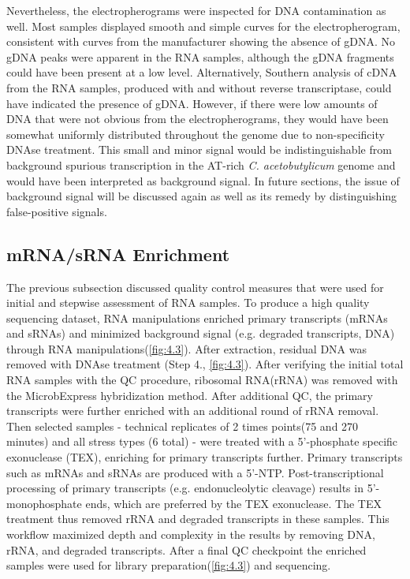 Nevertheless, the electropherograms were inspected for DNA contamination as well. Most samples displayed smooth and simple curves for the electropherogram, consistent with curves from the manufacturer showing the absence of gDNA.\cite{204} No gDNA peaks were apparent in the RNA samples, although the gDNA fragments could have been present at a low level. Alternatively, Southern analysis of cDNA from the RNA samples, produced with and without reverse transcriptase, could have indicated the presence of gDNA. However, if there were low amounts of DNA that were not obvious from the electropherograms, they would have been somewhat uniformly distributed throughout the genome due to non-specificity DNAse treatment. This small and minor signal would be indistinguishable from background spurious transcription in the AT-rich \textit{C. acetobutylicum} genome and would have been interpreted as background signal. In future sections, the issue of background signal will be discussed again as well as its remedy by distinguishing false-positive signals.


\subsection{mRNA/sRNA Enrichment}
The previous subsection discussed quality control measures that were used for initial and stepwise assessment of RNA samples. To produce a high quality sequencing dataset, RNA manipulations enriched primary transcripts (mRNAs and sRNAs) and minimized background signal (e.g. degraded transcripts, DNA) through RNA manipulations(\ref{fig:4.3}). After extraction, residual DNA was removed with DNAse treatment (Step 4., \ref{fig:4.3}). After verifying the initial total RNA samples with the QC procedure, ribosomal RNA(rRNA) was removed with the MicrobExpress hybridization method. After additional QC, the primary transcripts were further enriched with an additional round of rRNA removal. Then selected samples - technical replicates of 2 times points(75 and 270 minutes) and all stress types (6 total) - were treated with a 5'-phosphate specific exonuclease (TEX), enriching for primary transcripts further. Primary transcripts such as mRNAs and sRNAs are produced with a 5'-NTP. Post-transcriptional processing of primary transcripts (e.g. endonucleolytic cleavage) results in 5'-monophosphate ends, which are preferred by the TEX exonuclease. The TEX treatment thus removed rRNA and degraded transcripts in these samples. This workflow maximized depth and complexity in the results by removing DNA, rRNA, and degraded transcripts. After a final QC checkpoint the enriched samples were used for library preparation(\ref{fig:4.3}) and sequencing.



